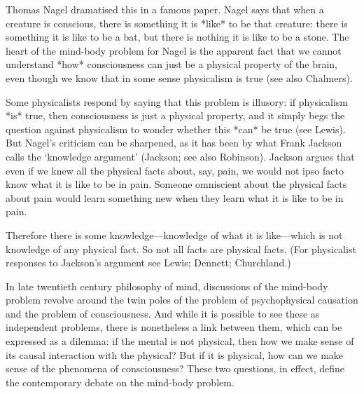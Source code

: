 Thomas Nagel dramatised this in a famous paper\autocite{Nagel1}. Nagel says that
when a creature is conscious, there is something it is *like* to be that creature: there
is something it is like to be a bat, but there is nothing it is like to be a stone. The heart
of the mind-body problem for Nagel is the apparent fact that we cannot understand
*how* consciousness can just be a physical property of the brain, even though we
know that in some sense physicalism is true (see also Chalmers\autocite{Chalmers1}).

Some physicalists respond by saying that this problem is illusory: if physicalism
*is* true, then consciousness is just a physical property, and it simply begs the
question against physicalism to wonder whether this *can* be true (see Lewis\autocite{Lewis3}).
But Nagel’s criticism can be sharpened, as it has been by what Frank Jackson calls
the ‘knowledge argument’ (Jackson\autocite{Jackson2}; see also Robinson\autocite{Robinson1}). Jackson argues
that even if we knew all the physical facts about, say, pain, we would not ipso facto
know what it is like to be in pain. Someone omniscient about the physical facts
about pain would learn something new when they learn what it is like to be in pain.

Therefore there is some knowledge—knowledge of what it is like—which is not
knowledge of any physical fact. So not all facts are physical facts. (For physicalist
responses to Jackson’s argument see Lewis\autocite{Lewis4}; Dennett\autocite{Dennett1}; Churchland\autocite{Churchland1}.)

In late twentieth century philosophy of mind, discussions of the mind-body
problem revolve around the twin poles of the problem of psychophysical causation
and the problem of consciousness. And while it is possible to see these as
independent problems, there is nonetheless a link between them, which can be
expressed as a dilemma: if the mental is not physical, then how we make sense of its
causal interaction with the physical? But if it is physical, how can we make sense of
the phenomena of consciousness? These two questions, in effect, define the
contemporary debate on the mind-body problem.
\setcounter{footnote}{\theff}